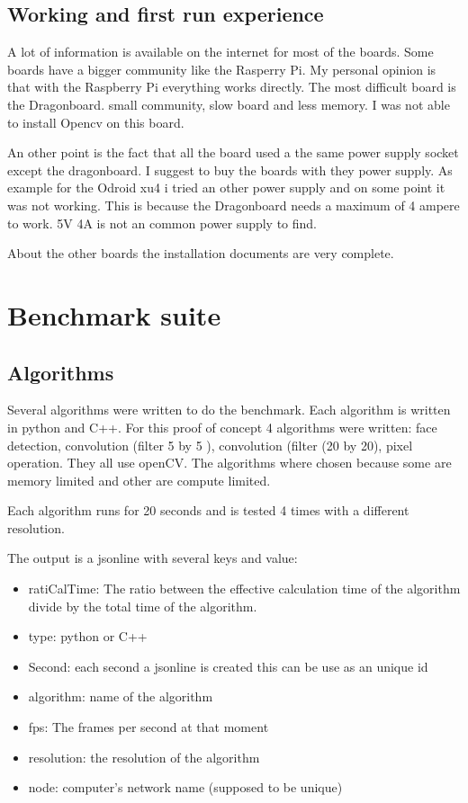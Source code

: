 \documentclass[english]{book_template} %
\begin{document}
\section{Working and first run experience}

A lot of information is available on the internet for most of the boards. Some boards have a bigger community like the Rasperry Pi.
My personal opinion is that with the Raspberry Pi everything works directly. The most difficult board is the Dragonboard. small community, slow board and less memory. I was not able to install Opencv on this board.

An other point is the fact that all the board used a the same power supply socket except the dragonboard. I suggest to buy the boards with they power supply. As example for the Odroid xu4 i tried an other power supply and on some point it was not working. This is because the Dragonboard needs a maximum of 4 ampere to work. 5V 4A is not an common power supply to find.

About the other boards the installation documents are very complete. 

 
\chapter{Benchmark suite}


\section{Algorithms}
Several algorithms were written to do the benchmark. Each algorithm is written in python and C++. For this proof of concept 4 algorithms were written: face detection,  convolution (filter 5 by 5 ), convolution (filter (20 by 20), pixel operation. They all use openCV. The algorithms where chosen because some are memory limited and other are compute limited. 

Each algorithm runs for 20 seconds and is tested 4 times with a different resolution. 

The output is a jsonline with several keys and value:
\begin{itemize}
\item ratiCalTime: The ratio between the effective calculation time of the algorithm divide by the total time of the algorithm.
\item type: python or C++
\item Second: each second a jsonline is created this can be use as an unique id
\item algorithm: name of the algorithm
\item fps: The frames per second at that moment
\item resolution: the resolution of the algorithm
\item node: computer’s network name (supposed to be unique)
\end{itemize}
\end{document}
